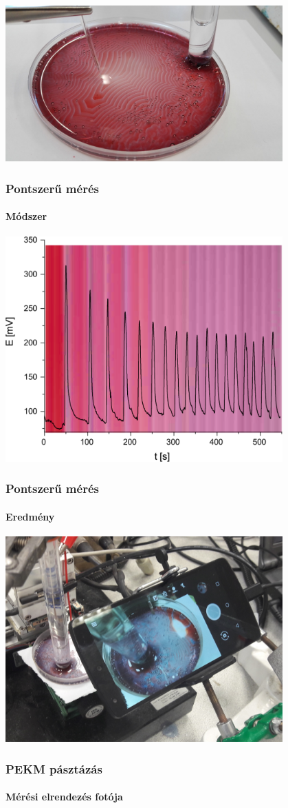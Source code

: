 \documentclass{beamer}
\begin{document}
\begin{frame}
	\centering
	\includegraphics[width=0.8\textwidth]{setup1.jpg}
	\frametitle{Pontszerű mérés}
	\framesubtitle{Módszer}
\end{frame}

\begin{frame}
	\centering
	\includegraphics[width=0.8\textwidth]{pontszerumeres.eps}
	\frametitle{Pontszerű mérés}
	\framesubtitle{Eredmény}
\end{frame}



\begin{frame}
	\centering
	\includegraphics[width=0.8\textwidth]{setup_photo.jpg}
	\frametitle{PEKM pásztázás}
	\framesubtitle{Mérési elrendezés fotója}
\end{frame}
\end{document}
